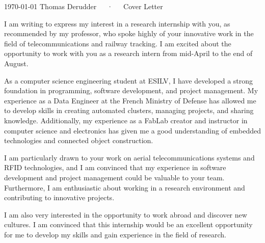 \documentclass[11pt, a4paper]{awesome-cv}
\begin{document}
\makecvheader[R]

\makecvfooter
  {\today}
  {Thomas Derudder~~~·~~~Cover Letter}
  {}

\makelettertitle

\begin{cvletter}

I am writing to express my interest in a research internship with you, as recommended by my professor, who spoke highly of your innovative work in the field of telecommunications and railway tracking. I am excited about the opportunity to work with you as a research intern from mid-April to the end of August.

As a computer science engineering student at ESILV, I have developed a strong foundation in programming, software development, and project management. My experience as a Data Engineer at the French Ministry of Defense has allowed me to develop skills in creating automated clusters, managing projects, and sharing knowledge. Additionally, my experience as a FabLab creator and instructor in computer science and electronics has given me a good understanding of embedded technologies and connected object construction.

I am particularly drawn to your work on aerial telecommunications systems and RFID technologies, and I am convinced that my experience in software development and project management could be valuable to your team. Furthermore, I am enthusiastic about working in a research environment and contributing to innovative projects.

I am also very interested in the opportunity to work abroad and discover new cultures. I am convinced that this internship would be an excellent opportunity for me to develop my skills and gain experience in the field of research.

\end{cvletter}


\makeletterclosing
\end{document}
